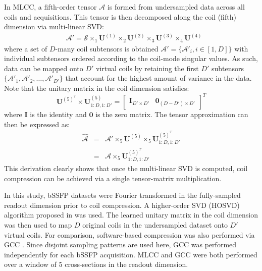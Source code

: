 \documentclass[11pt, onecolumn]{article}
\begin{document}
In MLCC, a fifth-order tensor $\mathcal{A}$ is formed from undersampled data across all coils and acquisitions. This tensor is then decomposed along the coil (fifth) dimension via multi-linear SVD:
\begin{eqnarray}
\label{eq:new_tensor}
& \mathcal{A}'=\mathcal{S}\!\times_1\!\mathbf{U}^{(1)}\!\times_2\!\mathbf{U}^{(2)}\!\times_3\!\mathbf{U}^{(3)}\!\times_4\!\mathbf{U}^{(4)}
\end{eqnarray}
where a set of $D$-many coil subtensors is obtained $\mathcal{A}'=\{\mathcal{A}'_i, i \in [1, D] \}$ with individual subtensors ordered according to the coil-mode singular values. As such, data can be mapped onto $D'$ virtual coils by retaining the first $D'$ subtensors $\{\mathcal{A}'_1, \mathcal{A}'_2, \dots, \mathcal{A}'_{D'} \}$ that account for the highest amount of variance in the data. Note that the unitary matrix in the coil dimension satisfies:
\begin{equation}
\label{eq:mlsvd_accelerate2}
\mathbf{U}^{(5)^T} \times \mathbf{U}_{1:D,1:D'}^{{(5)}}=\begin{bmatrix}
	\mathbf{I}_{D' \times D'} & \mathbf{0}_{(D\!-\!D')\times D'}
 \end{bmatrix}^T 
\end{equation}
where $\mathbf{I}$ is the identity and $\mathbf{0}$ is the zero matrix. The tensor approximation can then be expressed as:
\begin{eqnarray}
\label{eq:mlsvd_accelerate3}
\hat {\mathcal{A}} &=& \mathcal{A}'\times_5 \mathbf{U}^{(5)}\times_5\mathbf{U}_{1:D,1:D'}^{{(5)}^T} \\
&=& \mathcal{A}\times_5 \mathbf{U}_{1:D,1:D'}^{{(5)}^T} \nonumber
\end{eqnarray}
This derivation clearly shows that once the multi-linear SVD is computed, coil compression can be achieved via a single tensor-matrix multiplication.

In this study, bSSFP datasets were Fourier transformed in the fully-sampled readout dimension prior to coil compression. A higher-order SVD (HOSVD) algorithm proposed in \cite{de2000multilinear} was used. The learned unitary matrix in the coil dimension was then used to map $D$ original coils in the undersampled dataset onto $D'$ virtual coils. For comparison, software-based compression was also performed via GCC \cite{Zhang:2013df}. Since disjoint sampling patterns are used here, GCC was performed independently for each bSSFP acquisition. MLCC and GCC were both performed over a window of 5 cross-sections in the readout dimension.
\end{document}
